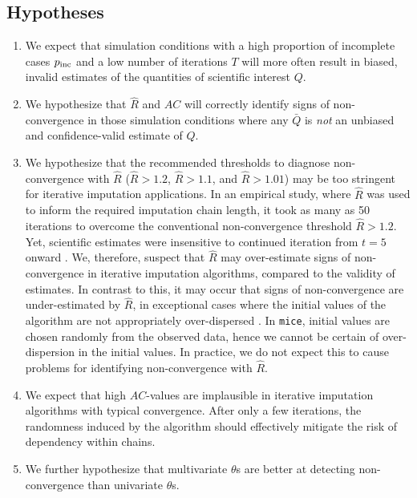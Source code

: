 \documentclass[Royal,times,sageh]{sagej}
\begin{document}
\hypertarget{hypotheses}{%
\subsection{Hypotheses}\label{hypotheses}}

\begin{enumerate}
\def\labelenumi{\arabic{enumi}.}
\item
  We expect that simulation conditions with a high proportion of incomplete cases \(p_{\rm inc}\) and a low number of iterations \(T\) will more often result in biased, invalid estimates of the quantities of scientific interest \(Q\).
\item
  We hypothesize that \(\widehat{R}\) and \(AC\) will correctly identify signs of non-convergence in those simulation conditions where any \(\bar{Q}\) is \emph{not} an unbiased and confidence-valid estimate of \(Q\).
\item
  We hypothesize that the recommended thresholds to diagnose non-convergence with \(\widehat{R}\) (\(\widehat{R} > 1.2\), \(\widehat{R} > 1.1\), and \(\widehat{R} > 1.01\)) may be too stringent for iterative imputation applications. In an empirical study, where \(\widehat{R}\) was used to inform the required imputation chain length, it took as many as 50 iterations to overcome the conventional non-convergence threshold \(\widehat{R}>1.2\). Yet, scientific estimates were insensitive to continued iteration from \(t=5\) onward \citep{lace07}. We, therefore, suspect that \(\widehat{R}\) may over-estimate signs of non-convergence in iterative imputation algorithms, compared to the validity of estimates. In contrast to this, it may occur that signs of non-convergence are under-estimated by \(\widehat{R}\), in exceptional cases where the initial values of the algorithm are not appropriately over-dispersed \citep[p.~437]{broo98}. In \texttt{mice}, initial values are chosen randomly from the observed data, hence we cannot be certain of over-dispersion in the initial values. In practice, we do not expect this to cause problems for identifying non-convergence with \(\widehat{R}\).
\item
  We expect that high \(AC\)-values are implausible in iterative imputation algorithms with typical convergence. After only a few iterations, the randomness induced by the algorithm should effectively mitigate the risk of dependency within chains.
\item
  We further hypothesize that multivariate \(\theta\)s are better at detecting non-convergence than univariate \(\theta\)s.
\end{enumerate}
\end{document}
